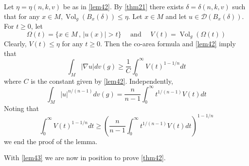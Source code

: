 \documentclass[12pt,hyperref,a4paper,UTF8]{ctexart}
\begin{document}
\begin{Proof}
Let $\eta=\eta(n, k, v)$ be as in \autoref{lem42}. By \autoref{thm21} there exists $\delta=\delta(n, k, v)$ such that for any $x \in M, \operatorname{Vol}_g\left(B_x(\delta)\right) \leq \eta$. Let $x \in M$ and let $u \in \mathcal{D}\left(B_{x}(\delta)\right)$. For $t \geq 0$, let
$$
\Omega(t)=\{x \in M \,,\,|u(x)|>t\}\quad \text { and } \quad V(t)=\operatorname{Vol}_g(\Omega(t))
$$
Clearly, $V(t) \leq \eta$ for any $t \geq 0$. Then the co-area formula and \autoref{lem42} imply that
$$
\int_M|\nabla u| d v(g) \geq \frac{1}{C} \int_0^{\infty} V(t)^{1-1 / n} d t
$$
where $C$ is the constant given by \autoref{lem42}. Independently,
$$
\int_M|u|^{n /(n-1)} d v(g)=\frac{n}{n-1} \int_0^{\infty} t^{1 /(n-1)} V(t) d t
$$
Noting that
$$
\int_0^{\infty} V(t)^{1-1 / n} d t \geq\left(\frac{n}{n-1} \int_0^{\infty} t^{1 /(n-1)} V(t) d t\right)^{1-1 / n}
$$
we end the proof of the lemma.
\end{Proof}

\vskip 3pt
With \autoref{lem43} we are now in position to prove \autoref{thm42}.
\end{document}
